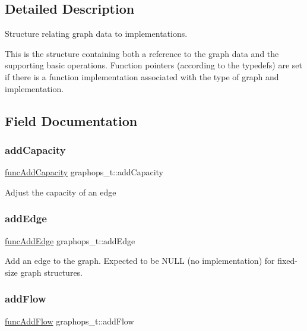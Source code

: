 \subsection{Detailed Description}
Structure relating graph data to implementations. 

This is the structure containing both a reference to the graph data and the supporting basic operations. Function pointers (according to the typedefs) are set if there is a function implementation associated with the type of graph and implementation. 

\subsection{Field Documentation}
\mbox{\label{structgraphops__t_aafe9596d5e7ae4ba579213c1f0c789c7}} 
\subsubsection{\texorpdfstring{add\+Capacity}{addCapacity}}
{\footnotesize\ttfamily \hyperlink{graphops_8h_a55fd1e1994412d16611818d876b2488e}{func\+Add\+Capacity} graphops\+\_\+t\+::add\+Capacity}

Adjust the capacity of an edge \mbox{\label{structgraphops__t_af9a74b6643b49f7799dfa78f4824aa22}} 
\subsubsection{\texorpdfstring{add\+Edge}{addEdge}}
{\footnotesize\ttfamily \hyperlink{graphops_8h_aba7336fb04b988fb797cbcd8c9207d64}{func\+Add\+Edge} graphops\+\_\+t\+::add\+Edge}



Add an edge to the graph. Expected to be N\+U\+LL (no implementation) for fixed-\/size graph structures. 

\mbox{\label{structgraphops__t_ae412853235d06cde6a63257a5fc172e1}} 
\subsubsection{\texorpdfstring{add\+Flow}{addFlow}}
{\footnotesize\ttfamily \hyperlink{graphops_8h_a595d28f6e4e3cef8d9549139dd40af53}{func\+Add\+Flow} graphops\+\_\+t\+::add\+Flow}

